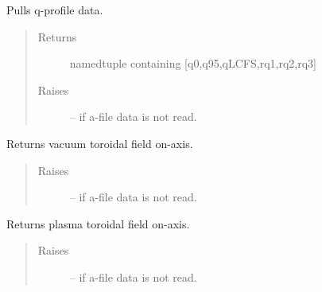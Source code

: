 \documentclass[letterpaper,10pt,english]{sphinxmanual}
\begin{document}
\begin{fulllineitems}
\begin{fulllineitems}
\label{eqtools:eqtools.eqdskreader.EqdskReader.getQs}
Pulls q-profile data.
\begin{quote}\begin{description}
\item[{Returns}] \leavevmode
namedtuple containing {[}q0,q95,qLCFS,rq1,rq2,rq3{]}

\item[{Raises }] \leavevmode
{} -- 
if a-file data is not read.

\end{description}\end{quote}

\end{fulllineitems}


\begin{fulllineitems}
\label{eqtools:eqtools.eqdskreader.EqdskReader.getBtVac}
Returns vacuum toroidal field on-axis.
\begin{quote}\begin{description}
\item[{Raises }] \leavevmode
{} -- 
if a-file data is not read.

\end{description}\end{quote}

\end{fulllineitems}


\begin{fulllineitems}
\label{eqtools:eqtools.eqdskreader.EqdskReader.getBtPla}
Returns plasma toroidal field on-axis.
\begin{quote}\begin{description}
\item[{Raises }] \leavevmode
{} -- 
if a-file data is not read.

\end{description}\end{quote}

\end{fulllineitems}



\end{fulllineitems}
\end{document}
